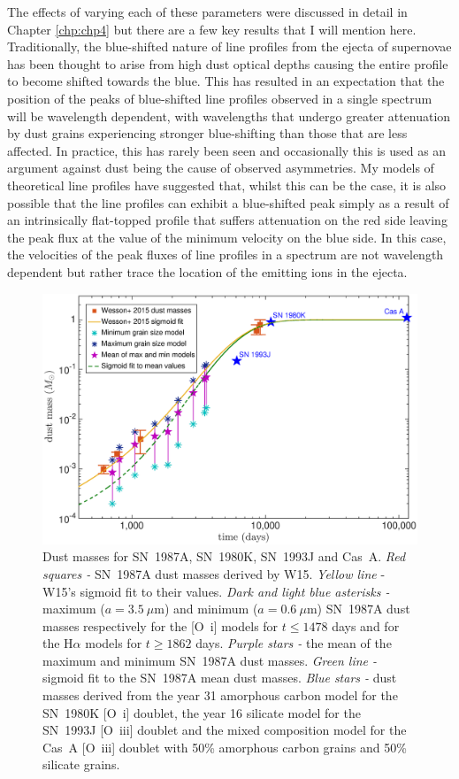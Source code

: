 The effects of varying each of these parameters were discussed in detail in Chapter \ref{chp:chp4} but there are a few key results that I will mention here.  Traditionally, the blue-shifted nature of line profiles from the ejecta of supernovae has been thought to arise from high dust optical depths causing the entire profile to become shifted towards the blue.  This has resulted in an expectation that the position of the peaks of blue-shifted line profiles observed in a single spectrum will be wavelength dependent, with wavelengths that undergo greater attenuation by dust grains experiencing stronger blue-shifting than those that are less affected.  In practice, this has rarely been seen and occasionally this is used as an argument against dust being the cause of observed asymmetries.  My models of theoretical line profiles have suggested that, whilst this can be the case, it is also possible that the line profiles can exhibit a blue-shifted peak simply as a result of an intrinsically flat-topped profile that suffers attenuation on the red side leaving the peak flux at the value of the minimum velocity on the blue side.  In this case, the velocities of the peak fluxes of line profiles in a spectrum are not wavelength dependent but rather trace the location of the emitting ions in the ejecta.

\begin{figure}
\centering
\includegraphics[scale=0.43,clip=true, trim=45 15 80 30]{chapters/chapter7/figs/Mdust_evol9.eps}
\caption{Dust masses for SN~1987A, SN~1980K, SN~1993J and Cas~A. \textit{Red squares -} SN~1987A dust masses derived by W15. \textit{Yellow line} - 
W15's sigmoid fit to 
their values. \textit{Dark and light blue asterisks -} maximum 
($a=3.5~\mu$m) and 
minimum ($a=0.6~\mu$m) SN~1987A dust masses respectively for the [O~{\sc i}] models 
for $t \le 1478$ days and for the H$\alpha$ models for $t \ge 1862$ days. 
\textit{Purple 
stars -}  the mean of the maximum and 
minimum SN~1987A dust masses.
\textit{Green line -} sigmoid fit 
to the SN~1987A mean dust masses.  \textit{Blue stars -} dust masses derived from the year 31 amorphous carbon model for the SN~1980K [O~{\sc i}] doublet, the year 16 silicate model for the SN~1993J  [O~{\sc iii}] doublet and the mixed composition model for the Cas~A [O~{\sc iii}] doublet with 50\% amorphous carbon grains and 50\% silicate grains.}
\label{dust1}
\end{figure}

